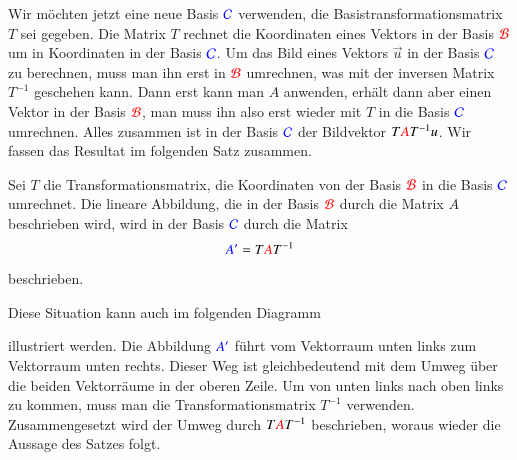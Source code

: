 Wir möchten jetzt eine neue Basis $\color{blue}\mathcal{C}$ verwenden, die
Basistransformationsmatrix $T$ sei gegeben.
Die Matrix $T$ rechnet die Koordinaten eines Vektors in der Basis
$\color{red}\mathcal{B}$ um in Koordinaten in der Basis
$\color{blue}\mathcal{C}$.
Um das Bild eines Vektors $\vec{u}$ in der Basis $\color{blue}\mathcal{C}$ 
zu berechnen, muss man ihn erst in $\color{red}\mathcal{B}$ umrechnen, was
mit der inversen Matrix $T^{-1}$ geschehen kann.
Dann erst kann man $A$ anwenden, erhält dann aber einen Vektor
in der Basis $\color{red}\mathcal{B}$, man muss ihn also erst wieder
mit $T$ in die Basis $\color{blue}\mathcal{C}$ umrechnen.
Alles zusammen ist in der Basis $\color{blue}\mathcal{C}$ der Bildvektor 
$T{\color{red}A}T^{-1}u$.
Wir fassen das Resultat im folgenden Satz zusammen.

\begin{satz}
\label{skript:affin:basiswechsel:satz}
Sei $T$ die Transformationsmatrix, die Koordinaten von der Basis
$\color{red}\mathcal{B}$ in die Basis $\color{blue}\mathcal{C}$ umrechnet.
Die lineare Abbildung, die in der Basis $\color{red}\mathcal{B}$ durch die
Matrix $A$ beschrieben wird, wird in der Basis $\color{blue}\mathcal{C}$ durch
die Matrix
\[
{\color{blue}A'}=T{\color{red}A}T^{-1}
\]
beschrieben.
\end{satz}

Diese Situation kann auch im folgenden Diagramm
\begin{center}
\end{center}
illustriert werden.
Die Abbildung $\color{blue}A'$ führt vom Vektorraum unten links zum
Vektorraum unten rechts.
Dieser Weg ist gleichbedeutend mit dem Umweg über die beiden Vektorräume
in der oberen Zeile.
Um von unten links nach oben links zu kommen, muss man die
Transformationsmatrix $T^{-1}$ verwenden.
Zusammengesetzt wird der Umweg durch $T{\color{red}A}T^{-1}$ beschrieben,
woraus wieder die Aussage des Satzes folgt.

